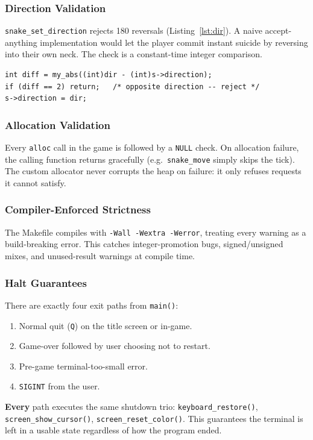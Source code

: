 \documentclass[conference]{IEEEtran}
\begin{document}
\subsubsection{Direction Validation}
\texttt{snake\_set\_direction} rejects 180\textdegree{} reversals (Listing~\ref{lst:dir}). A naive accept-anything implementation would let the player commit instant suicide by reversing into their own neck. The check is a constant-time integer comparison.

\begin{lstlisting}[caption={Direction validation prevents instant self-collision.},label={lst:dir}]
int diff = my_abs((int)dir - (int)s->direction);
if (diff == 2) return;   /* opposite direction -- reject */
s->direction = dir;
\end{lstlisting}

\subsubsection{Allocation Validation}
Every \texttt{alloc} call in the game is followed by a \texttt{NULL} check. On allocation failure, the calling function returns gracefully (e.g.\ \texttt{snake\_move} simply skips the tick). The custom allocator never corrupts the heap on failure: it only refuses requests it cannot satisfy.

\subsubsection{Compiler-Enforced Strictness}
The Makefile compiles with \texttt{-Wall -Wextra -Werror}, treating every warning as a build-breaking error. This catches integer-promotion bugs, signed/unsigned mixes, and unused-result warnings at compile time.

\subsubsection{Halt Guarantees}
There are exactly four exit paths from \texttt{main()}:
\begin{enumerate}
    \item Normal quit (\texttt{Q}) on the title screen or in-game.
    \item Game-over followed by user choosing not to restart.
    \item Pre-game terminal-too-small error.
    \item \texttt{SIGINT} from the user.
\end{enumerate}
\textbf{Every} path executes the same shutdown trio: \texttt{keyboard\_restore()}, \texttt{screen\_show\_cursor()}, \texttt{screen\_reset\_color()}. This guarantees the terminal is left in a usable state regardless of how the program ended.
\end{document}
